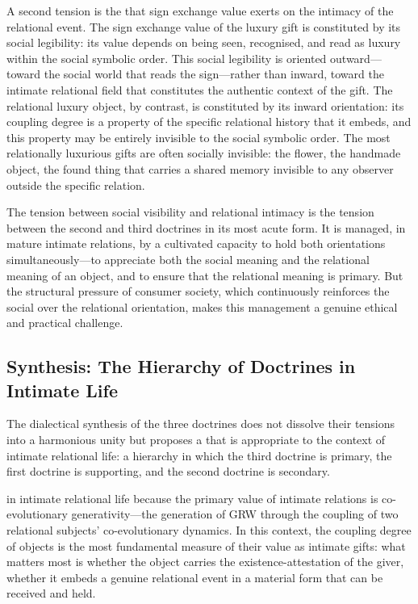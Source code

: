 A second tension is the  that sign exchange value exerts on the intimacy of the relational event. The sign exchange value of the luxury gift is constituted by its social legibility: its value depends on being seen, recognised, and read as luxury within the social symbolic order. This social legibility is oriented outward---toward the social world that reads the sign---rather than inward, toward the intimate relational field that constitutes the authentic context of the gift. The relational luxury object, by contrast, is constituted by its inward orientation: its coupling degree is a property of the specific relational history that it embeds, and this property may be entirely invisible to the social symbolic order. The most relationally luxurious gifts are often socially invisible: the flower, the handmade object, the found thing that carries a shared memory invisible to any observer outside the specific relation.

The tension between social visibility and relational intimacy is the tension between the second and third doctrines in its most acute form. It is managed, in mature intimate relations, by a cultivated capacity to hold both orientations simultaneously---to appreciate both the social meaning and the relational meaning of an object, and to ensure that the relational meaning is primary. But the structural pressure of consumer society, which continuously reinforces the social over the relational orientation, makes this management a genuine ethical and practical challenge.

\subsection{Synthesis: The Hierarchy of Doctrines in Intimate Life}
\label{p16:subsec:hierarchy}

\noindent
The dialectical synthesis of the three doctrines does not dissolve their tensions into a harmonious unity but proposes a  that is appropriate to the context of intimate relational life: a hierarchy in which the third doctrine is primary, the first doctrine is supporting, and the second doctrine is secondary.

 in intimate relational life because the primary value of intimate relations is co-evolutionary generativity---the generation of GRW through the coupling of two relational subjects' co-evolutionary dynamics. In this context, the coupling degree of objects is the most fundamental measure of their value as intimate gifts: what matters most is whether the object carries the existence-attestation of the giver, whether it embeds a genuine relational event in a material form that can be received and held.

